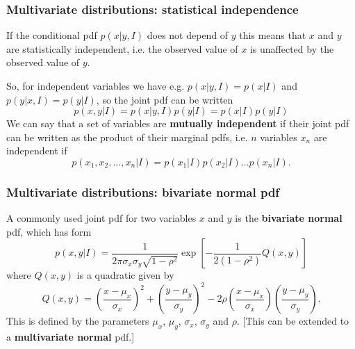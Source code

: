 \begin{frame}

\frametitle{Multivariate distributions: statistical independence}
\label{multivariatedistributions:statisticalindependence}

If the conditional pdf $p(x|y,I)$ does not depend of $y$ this means that $x$ and $y$ are statistically
independent, i.e. the observed value of $x$ is unaffected by the observed value of $y$.

So, for independent variables we have e.g. $p(x|y,I) = p(x|I)$ and $p(y|x,I) = p(y|I)$, so the joint pdf
can be written
\[
p(x,y|I) = p(x|y,I)p(y|I) = p(x|I)p(y|I)
\]
We can say that a set of variables are \textbf{mutually independent} if their joint pdf can be written as the
product of their marginal pdfs, i.e. $n$ variables $x_n$ are independent if
\[
p(x_1,x_2,\ldots,x_n|I) = p(x_1|I)p(x_2|I)\ldots p(x_n|I).
\]

\end{frame}

\begin{frame}

\frametitle{Multivariate distributions: bivariate normal pdf}
\label{multivariatedistributions:bivariatenormalpdf}

A commonly used joint pdf for two variables $x$ and $y$ is the \textbf{bivariate normal} pdf, which has form
\[
p(x,y|I) = \frac{1}{2\pi\sigma_x\sigma_y\sqrt{1-\rho^2}}\exp{\left[-\frac{1}{2(1-\rho^2)}Q(x,y)\right]}
\]
where $Q(x,y)$ is a quadratic given by
\[
Q(x,y) = \left(\frac{x-\mu_x}{\sigma_x}\right)^2 + \left(\frac{y-\mu_y}{\sigma_y}\right)^2 - 2\rho\left(\frac{x-\mu_x}{\sigma_x}\right)\left(\frac{y-\mu_y}{\sigma_y}\right).
\]
This is defined by the parameters $\mu_x$, $\mu_y$, $\sigma_x$, $\sigma_y$ and $\rho$. [This can be extended to
a \textbf{multivariate normal} pdf.]

\end{frame}

